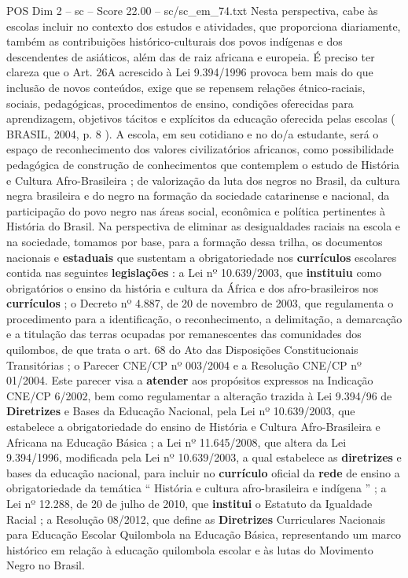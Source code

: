 \begin{textsample}{POS Dim 2 – sc – Score 22.00 – sc/sc\_em\_74.txt}
Nesta perspectiva, cabe às escolas incluir no contexto dos estudos e atividades, que proporciona diariamente, também as contribuições histórico-culturais dos povos indígenas e dos descendentes de asiáticos, além das de raiz africana e europeia.
É preciso ter clareza que o Art. 26A acrescido à Lei 9.394/1996 provoca bem mais do que inclusão de novos conteúdos, exige que se repensem relações étnico-raciais, sociais, pedagógicas, procedimentos de ensino, condições oferecidas para aprendizagem, objetivos tácitos e explícitos da educação oferecida pelas escolas ( BRASIL, 2004, p. 8 ).
A escola, em seu cotidiano e no do/a estudante, será o espaço de reconhecimento dos valores civilizatórios africanos, como possibilidade pedagógica de construção de conhecimentos que contemplem o estudo de História e Cultura Afro-Brasileira ; de valorização da luta dos negros no Brasil, da cultura negra brasileira e do negro na formação da sociedade catarinense e nacional, da participação do povo negro nas áreas social, econômica e política pertinentes à História do Brasil.
Na perspectiva de eliminar as desigualdades raciais na escola e na sociedade, tomamos por base, para a formação dessa trilha, os documentos nacionais e \textbf{estaduais} que sustentam a obrigatoriedade nos \textbf{currículos} escolares contida nas seguintes \textbf{legislações} : a Lei nº 10.639/2003, que \textbf{instituiu} como obrigatórios o ensino da história e cultura da África e dos afro-brasileiros nos \textbf{currículos} ; o Decreto nº 4.887, de 20 de novembro de 2003, que regulamenta o procedimento para a identificação, o reconhecimento, a delimitação, a demarcação e a titulação das terras ocupadas por remanescentes das comunidades dos quilombos, de que trata o art. 68 do Ato das Disposições Constitucionais Transitórias ; o Parecer CNE/CP nº 003/2004 e a Resolução CNE/CP nº 01/2004.
Este parecer visa a \textbf{atender} aos propósitos expressos na Indicação CNE/CP 6/2002, bem como regulamentar a alteração trazida à Lei 9.394/96 de \textbf{Diretrizes} e Bases da Educação Nacional, pela Lei nº 10.639/2003, que estabelece a obrigatoriedade do ensino de História e Cultura Afro-Brasileira e Africana na Educação Básica ; a Lei nº 11.645/2008, que altera da Lei 9.394/1996, modificada pela Lei nº 10.639/2003, a qual estabelece as \textbf{diretrizes} e bases da educação nacional, para incluir no \textbf{currículo} oficial da \textbf{rede} de ensino a obrigatoriedade da temática “ História e cultura afro-brasileira e indígena ” ; a Lei nº 12.288, de 20 de julho de 2010, que \textbf{institui} o Estatuto da Igualdade Racial ; a Resolução 08/2012, que define as \textbf{Diretrizes} Curriculares Nacionais para Educação Escolar Quilombola na Educação Básica, representando um marco histórico em relação à educação quilombola escolar e às lutas do Movimento Negro no Brasil.

\end{textsample}
